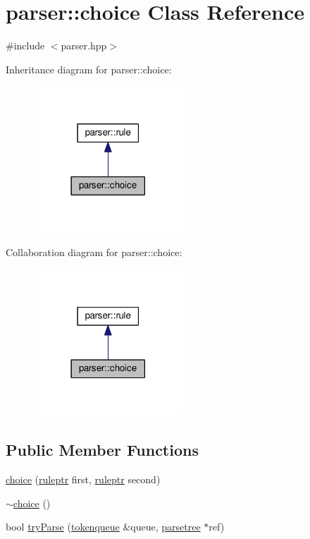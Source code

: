 \hypertarget{classparser_1_1choice}{}\section{parser\+:\+:choice Class Reference}
\label{classparser_1_1choice}


{\ttfamily \#include $<$parser.\+hpp$>$}



Inheritance diagram for parser\+:\+:choice\+:\nopagebreak
\begin{figure}[H]
\begin{center}
\leavevmode
\includegraphics[width=158pt]{classparser_1_1choice__inherit__graph}
\end{center}
\end{figure}


Collaboration diagram for parser\+:\+:choice\+:\nopagebreak
\begin{figure}[H]
\begin{center}
\leavevmode
\includegraphics[width=158pt]{classparser_1_1choice__coll__graph}
\end{center}
\end{figure}
\subsection*{Public Member Functions}
\begin{DoxyCompactItemize}
\item 
\hyperlink{classparser_1_1choice_ae9e624b9260ed9006741d6870ea334e4}{choice} (\hyperlink{namespaceparser_a85b2df48287fddaca144a5f6c01b4761}{ruleptr} first, \hyperlink{namespaceparser_a85b2df48287fddaca144a5f6c01b4761}{ruleptr} second)
\item 
\hyperlink{classparser_1_1choice_ad6fe3cd8e19171e387c8ff34e1291f83}{$\sim$choice} ()
\item 
bool \hyperlink{classparser_1_1choice_a76d73bd6b3adb0c8a062b46a4d49cd11}{try\+Parse} (\hyperlink{classparser_1_1tokenqueue}{tokenqueue} \&queue, \hyperlink{structparser_1_1parsetree}{parsetree} $\ast$ref)
\end{DoxyCompactItemize}
